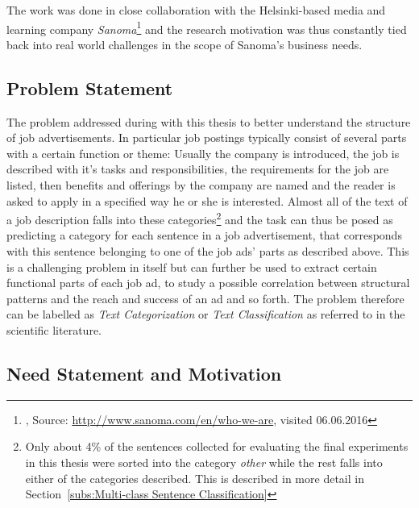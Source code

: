The work was done in close collaboration with the Helsinki-based media and learning company \emph{Sanoma}\footnote{, Source: \url{http://www.sanoma.com/en/who-we-are}, visited 06.06.2016} and the research motivation was thus constantly tied back into real world challenges in the scope of Sanoma's business needs.

\subsection{Problem Statement}

The problem addressed during with this thesis to better understand the structure of job advertisements. In particular job postings typically consist of several parts with a certain function or theme: Usually the company is introduced, the job is described with it's tasks and responsibilities, the requirements for the job are listed, then benefits and offerings by the company are named and the reader is asked to apply in a specified way he or she is interested.
Almost all of the text of a job description falls into these categories\footnote{Only about 4\% of the sentences collected for evaluating the final experiments in this thesis were sorted into the category \emph{other} while the rest falls into either of the categories described. This is described in more detail in Section~\ref{subs:Multi-class Sentence Classification}} and the task can thus be posed as predicting a category for each sentence in a job advertisement, that corresponds with this sentence belonging to one of the job ads' parts as described above.
This is a challenging problem in itself but can further be used to extract certain functional parts of each job ad, to study a possible correlation between structural patterns and the reach and success of an ad and so forth. The problem therefore can be labelled as \emph{Text Categorization} or \emph{Text Classification} as referred to in the scientific literature.


\subsection{Need Statement and Motivation}

